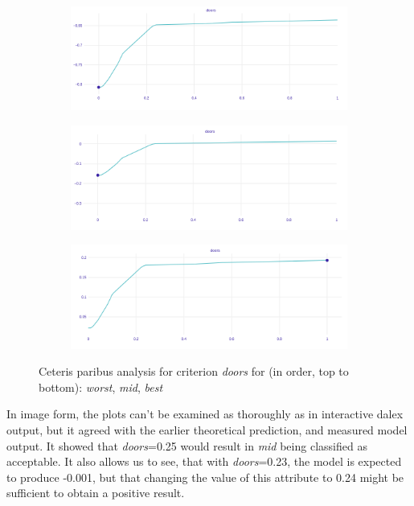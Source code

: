 \documentclass[../main.tex]{subfiles}
\begin{document}
\begin{figure}
    \centering
    \begin{subfigure}[b]{\linewidth}
        \makeatletter{}\makeatother
        \includegraphics[width=\linewidth]{../img/doors_worst.png}
        \label{fig:UTA-ceteris-paribus-doors}
    \end{subfigure}
    \begin{subfigure}[b]{\linewidth}
        \includegraphics[width=\linewidth]{../img/doors_medium.png}
    \end{subfigure}
    \begin{subfigure}[b]{\linewidth}
        \includegraphics[width=\linewidth]{../img/doors_best.png}
    \end{subfigure}
    \caption{Ceteris paribus analysis for criterion \emph{doors} for (in order, top to bottom): \emph{worst}, \emph{mid}, \emph{best}}
\end{figure}

In image form, the plots can't be examined as thoroughly as in interactive dalex output, but it agreed
with the earlier theoretical prediction, and measured model output. It showed that \emph{doors}=0.25 would result
in \emph{mid} being classified as acceptable. It also allows us to see, that with \emph{doors}=0.23, the
model is expected to produce -0.001, but that changing the value of this attribute to 0.24 might be sufficient to
obtain a positive result.
\end{document}
